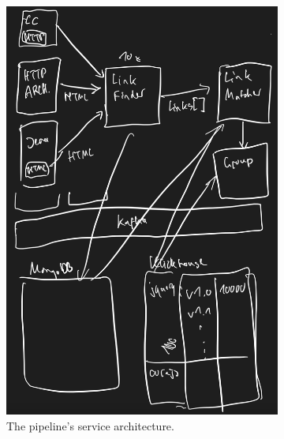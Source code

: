 \begin{figure}[H]
    \centering
    \begin{subfigure}{.45\textwidth}
      \centering
      \includegraphics[width=\linewidth]{figures/approach-services.png}
      \caption{The pipeline's service architecture.}
      \label{fig:design-intuitive-approach-services}
    \end{subfigure}
    \hspace{0.05\textwidth}
    \begin{subfigure}{0.45\textwidth}
      \centering

\end{subfigure}
\end{figure}
